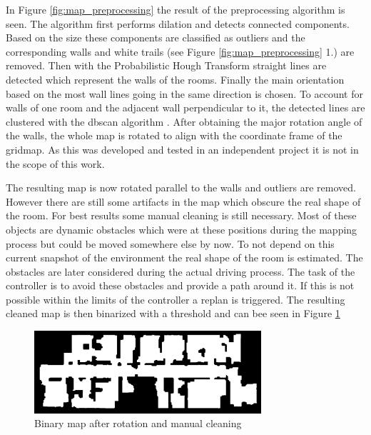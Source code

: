 In Figure \ref{fig:map_preprocessing} the result of the preprocessing algorithm is seen. The algorithm first performs dilation and detects connected components. Based on the size these components are classified as outliers and the corresponding walls and white trails (see Figure \ref{fig:map_preprocessing} 1.) are removed. Then with the Probabilistic Hough Transform \cite{matas_robust_2000} straight lines are detected which represent the walls of the rooms. Finally the main orientation based on the most wall lines going in the same direction is chosen. To account for walls of one room and the adjacent wall perpendicular to it, the detected lines are clustered with the \gls{dbscan} algorithm \cite{ester_density-based_1996}. After obtaining the major rotation angle of the walls, the whole map is rotated to align with the coordinate frame of the gridmap. As this was developed and tested in an independent project it is not in the scope of this work.

The resulting map is now rotated parallel to the walls and outliers are removed. However there are still some artifacts in the map which obscure the real shape of the room. For best results some manual cleaning is still necessary. Most of these objects are dynamic obstacles which were at these positions during the mapping process but could be moved somewhere else by now. To not depend on this current snapshot of the environment the real shape of the room is estimated. The obstacles are later considered during the actual driving process. The task of the controller is to avoid these obstacles and provide a path around it. If this is not possible within the limits of the controller a replan is triggered. The resulting cleaned map is then binarized with a threshold and can bee seen in Figure \ref{fig:map_cleaned}

\begin{figure}[h]
    \centering
    \includegraphics[width=0.75\textwidth]{figures/50_implementation/ryu.png}
    \caption[Binary map after rotation and manual cleaning]{Binary map after rotation and manual cleaning}
    \label{fig:map_cleaned}
\end{figure}


